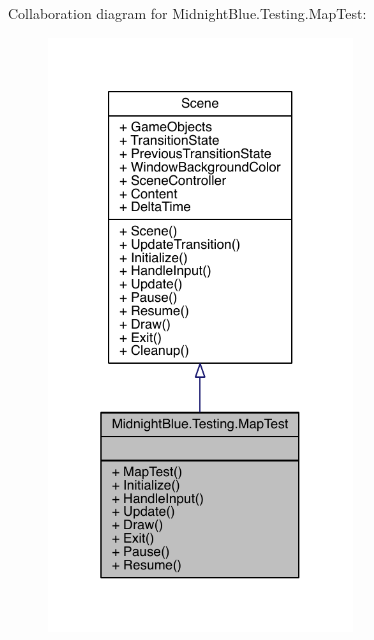Collaboration diagram for Midnight\+Blue.\+Testing.\+Map\+Test\+:\nopagebreak
\begin{figure}[H]
\begin{center}
\leavevmode
\includegraphics[width=229pt]{class_midnight_blue_1_1_testing_1_1_map_test__coll__graph}
\end{center}
\end{figure}
